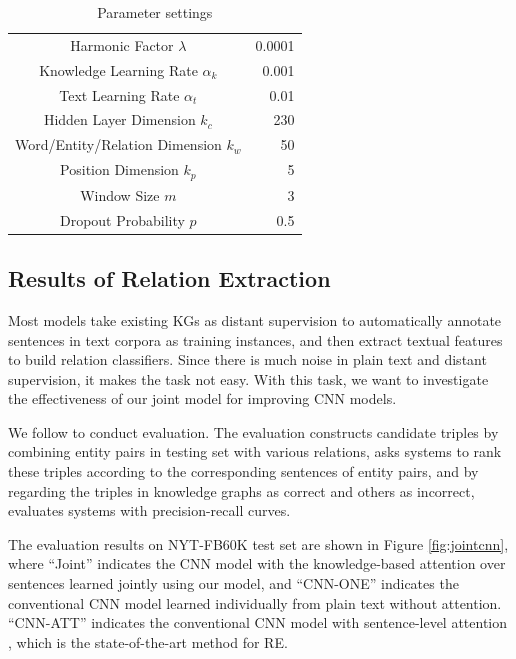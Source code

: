 \documentclass[11pt,a4paper]{article}
\begin{document}
\begin{table}[htb]
\centering
\small
\label{my-label}
\begin{tabular}{|cr|}
\hline
\multicolumn{1}{|c|}{Harmonic Factor $\lambda$}                & 0.0001 \\
\multicolumn{1}{|c|}{Knowledge Learning Rate $\alpha_k$}        & 0.001 \\
\multicolumn{1}{|c|}{Text Learning Rate $\alpha_t$}             & 0.01  \\
\multicolumn{1}{|c|}{Hidden Layer Dimension $k_c$}        & 230   \\
\multicolumn{1}{|c|}{Word/Entity/Relation Dimension $k_w$} & 50    \\
\multicolumn{1}{|c|}{Position Dimension $k_p$}            & 5     \\
\multicolumn{1}{|c|}{Window Size $m$}    & 3     \\
\multicolumn{1}{|c|}{Dropout Probability $p$}            & 0.5  \\
\hline
\end{tabular}
\caption{Parameter settings}
\label{parameters}
\end{table}


\subsection{Results of Relation Extraction}

Most models \cite{mintz2009distant,riedel2010modeling,hoffmann2011knowledge,surdeanu2012multi,zeng2014relation,zeng2015distant,lin2016neural} take existing KGs as distant supervision to automatically annotate sentences in text corpora as training instances, and then extract textual features to build relation classifiers. Since there is much noise in plain text and distant supervision, it makes the task not easy. With this task, we want to investigate the effectiveness of our joint model for improving CNN models.

We follow \cite{weston2013connecting} to conduct evaluation. The evaluation constructs candidate triples by combining entity pairs in testing set with various relations, asks systems to rank these triples according to the corresponding sentences of entity pairs, and by regarding the triples in knowledge graphs as correct and others as incorrect, evaluates systems with precision-recall curves.

The evaluation results on NYT-FB60K test set are shown in Figure \ref{fig:jointcnn}, where ``Joint'' indicates the CNN model with the knowledge-based attention over sentences learned jointly using our model, and ``CNN-ONE'' indicates the conventional CNN model learned individually from plain text without attention. ``CNN-ATT'' indicates the conventional CNN model with sentence-level attention \cite{lin2016neural}, which is the state-of-the-art method for RE. 
\end{document}
